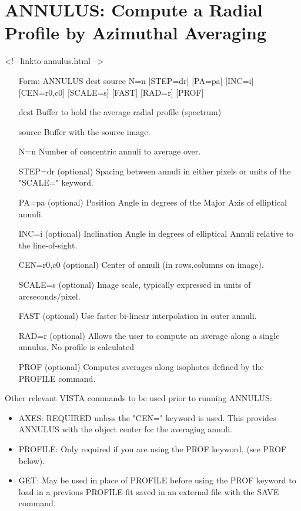 \section{ANNULUS: Compute a Radial Profile by Azimuthal Averaging}
\begin{rawhtml}
<!-- linkto annulus.html -->
\end{rawhtml}
\begin{itemize}
  \item[Form: ANNULUS dest source N=n {[STEP=dr]} {[PA=pa]} {[INC=i]} 
       {[CEN=r0,c0]} {[SCALE=s]} {[FAST]} {[RAD=r]} {[PROF]}\hfill]{}
  \item[dest]{Buffer to hold the average radial profile (spectrum)}
  \item[source]{Buffer with the source image.}
  \item[N=n]{Number of concentric annuli to average over.}
  \item[STEP=dr]{(optional) Spacing between annuli in either pixels or
       units of the "SCALE=" keyword.}
  \item[PA=pa]{(optional) Position Angle in degrees of the Major Axis 
       of elliptical annuli.}
  \item[INC=i]{(optional) Inclination Angle in degrees of elliptical 
       Annuli relative to the line-of-sight.}
  \item[CEN=r0,c0]{(optional) Center of annuli (in rows,columns on image).}
  \item[SCALE=s]{(optional) Image scale, typically expressed in units
       of arcseconds/pixel.}
  \item[FAST]{(optional) Use faster bi-linear interpolation in outer annuli.}
  \item[RAD=r]{(optional) Allows the user to compute an average along
       a single annulus.  No profile is calculated}
  \item[PROF]{(optional) Computes averages along isophotes defined by
       the PROFILE command.}
\end{itemize}

Other relevant VISTA commands to be used prior to running ANNULUS:
\begin{itemize}
  \item{AXES: REQUIRED unless the "CEN=" keyword is used.  This provides
        ANNULUS with the object center for the averaging annuli. }

  \item{PROFILE: Only required if you are using the PROF keyword. (see PROF
        below).}

  \item{GET: May be used in place of PROFILE before using the PROF keyword
        to load in a previous PROFILE fit saved in an external file with
        the SAVE command. }
\end{itemize}
 
